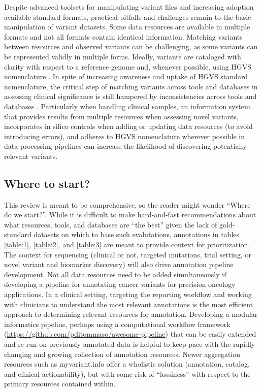 \documentclass{article}
\begin{document}
Despite advanced toolsets for manipulating variant files and
increasing adoption available standard formats, practical pitfalls and
challenges remain to the basic manipulation of variant datasets. Some
data resources are available in multiple formats and not all formats
contain identical information. Matching variants between resources and
observed variants can be challenging, as some variants can be
represented validly in multiple forms. Ideally, variants are cataloged
with clarity with respect to a reference genome and, whenever
possible, using HGVS nomenclature \parencite{Den_Dunnen2016-gw}. In spite
of increasing awareness and uptake of HGVS standard nomenclature, the
critical step of matching variants across tools and databases in
assessing clinical significance is still hampered by inconsistencies
across tools and databases \parencite{Yen2017-lq}. Particularly when
handling clinical samples, an information system that provides results
from multiple resources when assessing novel variants, incorporates in
silico controls when adding or updating data resources (to avoid
introducing errors), and adheres to HGVS nomenclature wherever
possible in data processing pipelines can increase the likelihood of
discovering potentially relevant variants.

\subsection{Where to start?}

This review is meant to be comprehensive, so the reader might wonder
``Where do we start?''. While it is difficult to make hard-and-fast
recommendations about what resources, tools, and databases are ``the
best'' given the lack of gold-standard datasets on which to base such
evalutations, annotations in tables \ref{table:1}, \ref{table:2}, and
\ref{table:3} are meant to provide context for prioritization.
The context for sequencing (clinical or
not, targeted mutations, trial setting, or novel variant and biomarker
discovery) will also drive annotation pipeline development. Not all data resources need
to be added simultaneously if developing a pipeline for annotating
cancer variants for precision oncology applications. In a clinical
setting, targeting the reporting workflow and working with clinicians
to understand the most relevant annotations is the most efficient
approach to determining relevant resources for annotation. Developing a modular
informatics pipeline, perhaps using a computational workflow framework
(\url{https://github.com/pditommaso/awesome-pipeline}) that can be easily
extended and re-run on previously annotated data is helpful to keep
pace with the rapidly changing and growing collection of annotation
resources. Newer aggregation resources such as myvariant.info offer a
wholistic solution (annotation, catalog, and clinical actionability),
but with some risk of ``lossiness'' with respect to the primary
resources contained within. 
\end{document}
